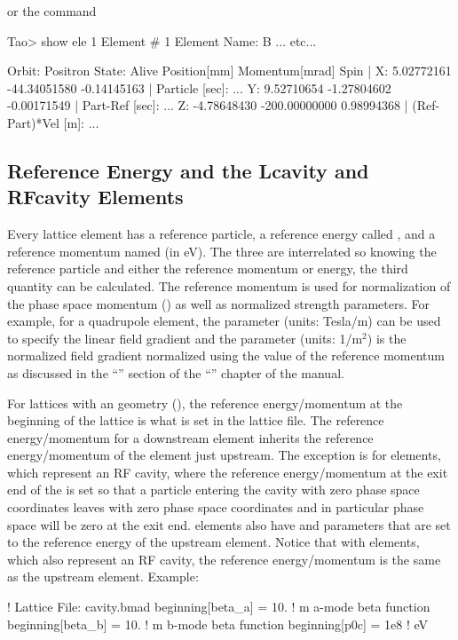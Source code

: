 \documentclass{hitec}     %
\begin{document}
{or the  command

\begin{code}
Tao> show ele 1
 Element #                1
 Element Name: B
... etc...

Orbit:  Positron   State: Alive
         Position[mm] Momentum[mrad]        Spin   |
  X:       5.02772161   -44.34051580  -0.14145163  | Particle [sec]:     ...
  Y:       9.52710654    -1.27804602  -0.00171549  | Part-Ref [sec]:     ...
  Z:      -4.78648430  -200.00000000   0.98994368  | (Ref-Part)*Vel [m]: ...
\end{code}

\subsection{Reference Energy and the Lcavity and RFcavity Elements}
\label{s:ref.energy}

Every lattice element has a reference particle, a reference energy called , and a
reference momentum named  (in eV). The three are interrelated so knowing the reference
particle and either the reference momentum or energy, the third quantity can be calculated. The
reference momentum is used for normalization of the phase space momentum ()
as well as normalized strength parameters. For example, for a quadrupole element, the
 parameter (units: Tesla/m) can be used to specify the linear field gradient and the
 parameter (units: 1/m$^2$) is the normalized field gradient normalized using the value of
the reference momentum as discussed in the ``'' section of the
``'' chapter of the \bmad manual.

For lattices with an  geometry (), the reference energy/momentum at the
beginning of the lattice is what is set in the lattice file. The reference energy/momentum for a
downstream element inherits the reference energy/momentum of the element just upstream. The exception
is for  elements, which represent an RF cavity, where the reference energy/momentum at
the exit end of the  is set so that a particle entering the cavity with zero phase space
coordinates leaves with zero phase space coordinates and in particular phase space  will be
zero at the exit end.  elements also have  and  parameters
that are set to the reference energy of the upstream element. Notice that with 
elements, which also represent an RF cavity, the reference energy/momentum is the same as the
upstream element. Example:
\begin{code}
! Lattice File: cavity.bmad
beginning[beta_a] = 10.   ! m  a-mode beta function
beginning[beta_b] = 10.   ! m  b-mode beta function
beginning[p0c] = 1e8   ! eV  


\end{code}}
\end{document}
